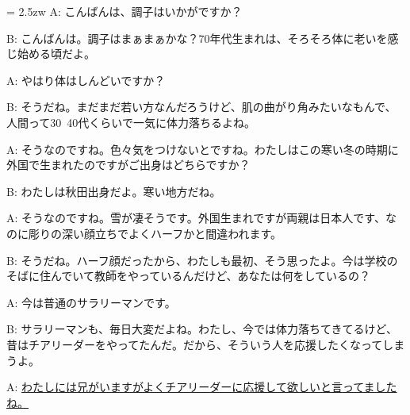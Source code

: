 \documentclass[11pt]{amsart}
\title{}
\author{}
\newenvironment{hangall}[1]{\hangindent = 2.5zw\everypar{\hangindent = 2.5zw}}{}
\begin{document}
\maketitle
\begin{hangall}{}%
A: こんばんは、調子はいかがですか？

B: こんばんは。調子はまぁまぁかな？70年代生まれは、そろそろ体に老いを感じ始める頃だよ。

A: やはり体はしんどいですか？

B: そうだね。まだまだ若い方なんだろうけど、肌の曲がり角みたいなもんで、人間って30~40代くらいで一気に体力落ちるよね。

A: そうなのですね。色々気をつけないとですね。わたしはこの寒い冬の時期に外国で生まれたのですがご出身はどちらですか？

B: わたしは秋田出身だよ。寒い地方だね。

A: そうなのですね。雪が凄そうです。外国生まれですが両親は日本人です、なのに彫りの深い顔立ちでよくハーフかと間違われます。

B: そうだね。ハーフ顔だったから、わたしも最初、そう思ったよ。今は学校のそばに住んでいて教師をやっているんだけど、あなたは何をしているの？

A: 今は普通のサラリーマンです。

B: サラリーマンも、毎日大変だよね。わたし、今では体力落ちてきてるけど、昔はチアリーダーをやってたんだ。だから、そういう人を応援したくなってしまうよ。

A: \ul{わたしには兄がいますがよくチアリーダーに応援して欲しいと言ってましたね。}\end{hangall}
\end{document}
